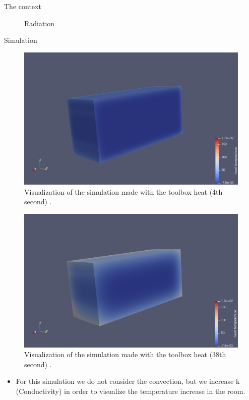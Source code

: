\begin{frame}[allowframebreaks]{The context}
\begin{minipage}{0.35\linewidth}
\begin{figure}
        \caption{Radiation}
    \end{figure}
\end{minipage}

\end{frame}
\begin{frame}[allowframebreaks]{Simulation}
\begin{minipage}{0.48\linewidth}
    \begin{figure}
        \centering
        \includegraphics[width=\linewidth]{"images/enkf/Simulation_1.jpg"}
        \caption{Visualization of the simulation made with the toolbox heat (4th second) .}
    \end{figure}
\end{minipage} \;
\begin{minipage}{0.46\linewidth}
    \begin{figure}
        \centering
        \includegraphics[width=\linewidth]{"images/enkf/Simulation_2.jpg"}
        \caption{Visualization of the simulation made with the toolbox heat (38th second) .}
    \end{figure}
\end{minipage}
\begin{itemize}
    \item For this simulation we do not consider the convection, but we increase k (Conductivity) in order to visualize the temperature increase in the room.
\end{itemize}

\end{frame}
    
